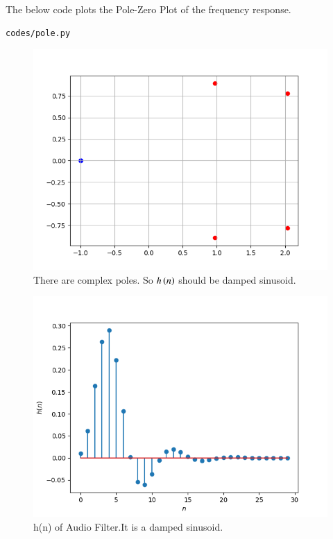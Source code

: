 \documentclass[journal,12pt,twocolumn]{IEEEtran}
\theoremstyle{remark}
\begin{document}
\begin{enumerate}[label=\thesection.\arabic*]
The below code plots the Pole-Zero Plot of the frequency response.
\begin{lstlisting}
codes/pole.py
\end{lstlisting}
\begin{figure}[ht]
\centering
\includegraphics[width=1\columnwidth]{figs/pole.png}
\caption{There are complex poles. So $h\left(n\right)$ should be damped sinusoid.}
\label{fig:pole_zero_6.2}
\end{figure}

\begin{figure}[h!]
    \centering
    \includegraphics[width=\columnwidth]{figs/filter_h_n.png}
    \caption{h(n) of Audio Filter.It is a damped sinusoid.}
    \label{fig:6.2_hn}
\end{figure}


\end{enumerate}
\end{document}

